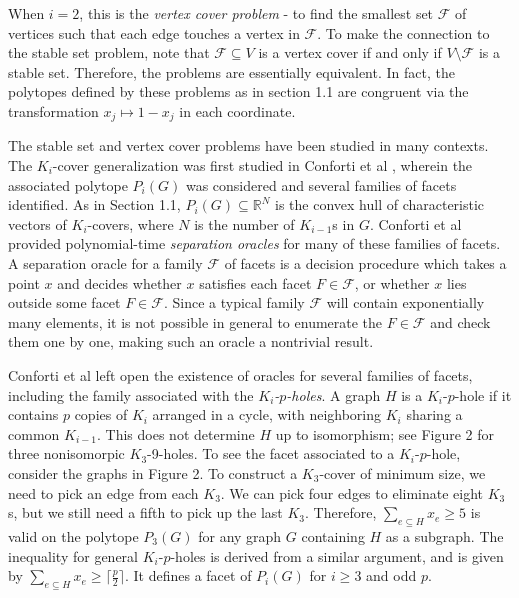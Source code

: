 When $i=2$, this is the \emph{vertex cover problem} - to find the smallest
set $\mathcal{F}$ of vertices such that each edge touches a vertex in
$\mathcal{F}$. To make the
connection to the stable set problem, note that $\mathcal{F} \subseteq V$ is a vertex
cover if and only if $V \setminus \mathcal{F}$ is a stable set.
Therefore, the problems are essentially equivalent. In fact, the polytopes
defined by these problems as in section 1.1 are congruent via the transformation
$x_j \mapsto 1-x_j$ in each coordinate.

The stable set and vertex cover problems have been studied in many contexts. 
The $K_i$-cover generalization was first studied in Conforti et al 
\cite{conforti}, wherein the associated polytope $P_i(G)$ was 
considered and several families of facets identified. 
As in Section 1.1, $P_i(G) \subseteq \mathbb{R}^N$ is the convex hull of
characteristic vectors of $K_i$-covers, where $N$ is the number of $K_{i-1}$s in
$G$. 
Conforti et al provided polynomial-time {\em separation oracles} for many of these families of facets. 
A separation oracle for a family $\mathcal{F}$ of facets is a decision procedure
which takes a point $x$ and decides whether $x$ satisfies each facet $F \in
\mathcal{F}$, or whether $x$ lies outside some facet $F \in \mathcal{F}$.
Since a typical family $\mathcal{F}$ will contain exponentially many elements, it is not possible in general to enumerate the $F \in \mathcal{F}$ and check them one by one, making such an oracle a nontrivial result.

Conforti et al left open the existence of oracles for several families of
facets, including the family associated with the {\em $K_i$-$p$-holes}. 
A graph $H$ is a $K_i$-$p$-hole if it contains $p$ copies of $K_i$ arranged in a cycle, with neighboring $K_i$ sharing a common $K_{i-1}$. 
This does not determine $H$ up to isomorphism; see Figure 2 for three nonisomorpic $K_3$-9-holes.
To see the facet associated to a $K_i$-$p$-hole, consider the graphs in Figure 2. 
To construct a $K_3$-cover of minimum size, we need to pick an edge from each $K_3$. 
We can pick four edges to eliminate eight $K_3$s, but we still need a fifth to pick up the last $K_3$. 
Therefore, $\sum_{e \subseteq H} x_e \ge 5$ is valid on the polytope $P_3(G)$ for any graph $G$ containing $H$ as a subgraph. 
The inequality for general $K_i$-$p$-holes is derived from a similar argument,
and is given by $\sum_{e \subseteq H} x_e \ge \lceil \frac{p}{2} \rceil$.
It defines a facet of $P_i(G)$ for $i \ge 3$ and odd $p$.

